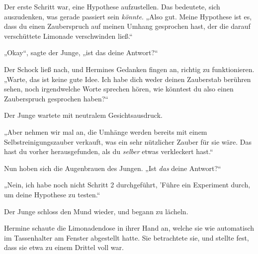Der erste Schritt war, eine Hypothese aufzustellen. Das bedeutete, sich auszudenken, was gerade passiert sein \emph{könnte}. „Also gut. Meine Hypothese ist es, dass du einen Zauberspruch auf meinen Umhang gesprochen hast, der die darauf verschüttete Limonade verschwinden ließ.“

„Okay“, sagte der Junge, „ist das deine Antwort?“

Der Schock ließ nach, und Hermines Gedanken fingen an, richtig zu funktionieren. „Warte, das ist keine gute Idee. Ich habe dich weder deinen Zauberstab berühren sehen, noch irgendwelche Worte sprechen hören, wie könntest du also einen Zauberspruch gesprochen haben?“

Der Junge wartete mit neutralem Gesichtsausdruck.

„Aber nehmen wir mal an, die Umhänge werden bereits mit einem Selbstreinigungszauber verkauft, was ein sehr nützlicher Zauber für sie wäre. Das hast du vorher herausgefunden, als du \emph{selber} etwas verkleckert hast.“

Nun hoben sich die Augenbrauen des Jungen. „Ist \emph{das} deine Antwort?“

„Nein, ich habe noch nicht Schritt 2 durchgeführt, 'Führe ein Experiment durch, um deine Hypothese zu testen.“

Der Junge schloss den Mund wieder, und begann zu lächeln.

Hermine schaute die Limonadendose in ihrer Hand an, welche sie wie automatisch im Tassenhalter am Fenster abgestellt hatte. Sie betrachtete sie, und stellte fest, dass sie etwa zu einem Drittel voll war.

